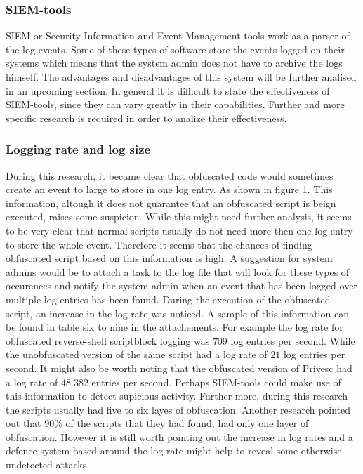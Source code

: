 \documentclass{article}%
\begin{document}
\subsubsection{SIEM-tools}
SIEM or Security Information and Event Management tools work as a parser of the log events. Some of these types of software store the events logged on their systems which means that the system admin does not have to archive the logs himself. The advantages and disadvantages of this system will be further analised in an upcoming section. In general it is difficult to state the effectiveness of SIEM-tools, since they can vary greatly in their capabilities. Further and more specific research is required in order to analize their effectiveness.
\subsubsection{Logging rate and log size}
During this research, it became clear that obfuscated code would sometimes create an event to large to store in one log entry. As shown in figure 1. This information, altough it does not guarantee that an obfuscated script is beign executed, raises some suspicion. While this might need further analysis, it seems to be very clear that normal scripts usually do not need more then one log entry to store the whole event. Therefore it seems that the chances of finding obfuscated script based on this information is high. A suggestion for system admins would be to attach a task to the log file that will look for these types of occurences and notify the system admin when an event that has been logged over multiple log-entries has been found.\newline
During the execution of the obfuscated script, an increase in the log rate was noticed. A sample of this information can be found in table six to nine in the attachements. For example the log rate for obfuscated reverse-shell scriptblock logging was $709$ log entries per second. While the unobfuscated version of the same script had a log rate of $21$ log entries per second. It might also be worth noting that the obfuscated version of Privesc had a log rate of $48.382$ entries per second.
Perhaps SIEM-tools could make use of this information to detect supicious activity.
Further more, during this research the scripts usually had five to six layes of obfuscation. Another research pointed out that $90$\% of the scripts that they had found, had only one layer of obfuscation. However it is still worth pointing out the increase in log rates and a defence system based around the log rate might help to reveal some otherwise undetected attacks.
\end{document}
